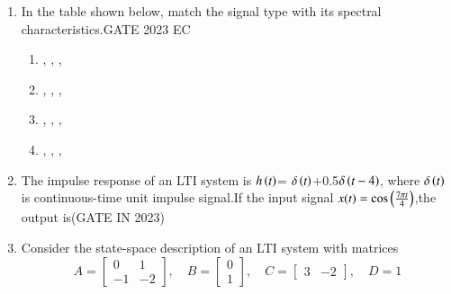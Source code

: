 \begin{enumerate}[label=\thechapter.\arabic*,ref=\thechapter.\theenumi]
\item In the table shown below, match the signal type with its spectral characteristics.\hfill{GATE 2023 EC}

\vspace{2mm}

\begin{table}[ht]
    \centering
    \def\arraystretch{2.5}
    
    \caption{ }
    \label{29.2023}
\end{table}

\begin{enumerate}
\item {} \textrightarrow {}  ,    \textrightarrow {}   ,    \textrightarrow {}   ,    \textrightarrow {}

\item {} \textrightarrow {}   ,   \textrightarrow {}   ,    \textrightarrow {}   ,    \textrightarrow {}

\item  {} \textrightarrow {}   ,    \textrightarrow {}   ,    \textrightarrow {}   ,    \textrightarrow {}

\item {} \textrightarrow {}   ,   \textrightarrow {}    ,    \textrightarrow {}   ,   \textrightarrow {}

\end{enumerate}
\solution
\newpage


\item
The impulse response of an LTI system is $h\left(t\right)$= $\delta\left(t\right)$+0.5$ \delta\left(t-4\right)$, where $\delta\left(t\right)$ is continuous-time unit impulse signal.If the input signal $x(t)=\cos\left(\frac{7\pi t}{4}\right)$,the output is\hfill(GATE IN 2023)\\
\solution 

\newpage

\newpage

\item Consider the state-space description of an LTI system with matrices
\[ 
A = \begin{bmatrix} 0 & 1 \\ -1 & -2 \end{bmatrix}, \quad 
B = \begin{bmatrix} 0 \\ 1 \end{bmatrix}, \quad 
C = \begin{bmatrix} 3 & -2 \end{bmatrix}, \quad 
D = 1 
\]


\end{enumerate}
